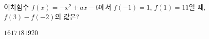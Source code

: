 이차함수 $f(x)=-x^2+ax-b$에서 $f(-1)=1$, $f(1)=11$일 때, $f(3)-f(-2)$의 값은?
\begin{choices32}{$16$}{$17$}{$18$}{$19$}{$20$}\end{choices32}
